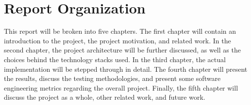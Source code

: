 \section{Report Organization}
\label{sect:report-organization}
This report will be broken into five chapters.  The first chapter will contain
an introduction to the project, the project motivation, and related work.  In
the second chapter, the project architecture will be further discussed, as well
as the choices behind the technology stacks used.  In the third chapter, the
actual implementation will be stepped through in detail.  The fourth chapter
will present the results, discuss the testing methodologies, and present some
software engineering metrics regarding the overall project.  Finally, the fifth
chapter will discuss the project as a whole, other related work, and future work.
